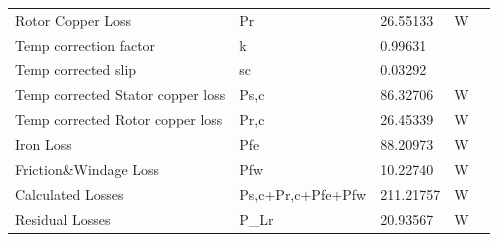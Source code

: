 \begin{table}[hbtp!]
\begin{tabular}{
    >{\columncolor[HTML]{9B9B9B}}l llll}
    Rotor   Copper Loss                                 & Pr                                        & 26.55133                          & W                            &  \\
    Temp   correction factor                            & \cellcolor[HTML]{F2F2F2}k                 & \cellcolor[HTML]{F2F2F2}0.99631   & \cellcolor[HTML]{F2F2F2}     &  \\
    Temp corrected   slip                               & sc                                        & 0.03292                           &                              &  \\
    Temp   corrected Stator copper loss                 & \cellcolor[HTML]{F2F2F2}Ps,c              & \cellcolor[HTML]{F2F2F2}86.32706  & \cellcolor[HTML]{F2F2F2}W    &  \\
    Temp   corrected Rotor copper loss                  & Pr,c                                      & 26.45339                          & W                            &  \\
    Iron Loss                                           & \cellcolor[HTML]{F2F2F2}Pfe               & \cellcolor[HTML]{F2F2F2}88.20973  & \cellcolor[HTML]{F2F2F2}W    &  \\
    Friction\&Windage   Loss                            & Pfw                                       & 10.22740                          & W                            &  \\
    Calculated   Losses                                 & \cellcolor[HTML]{F2F2F2}Ps,c+Pr,c+Pfe+Pfw & \cellcolor[HTML]{F2F2F2}211.21757 & \cellcolor[HTML]{F2F2F2}W    &  \\
    Residual   Losses                                   & P\_Lr                                     & 20.93567                          & W                            & 
\end{tabular}
\end{table}

